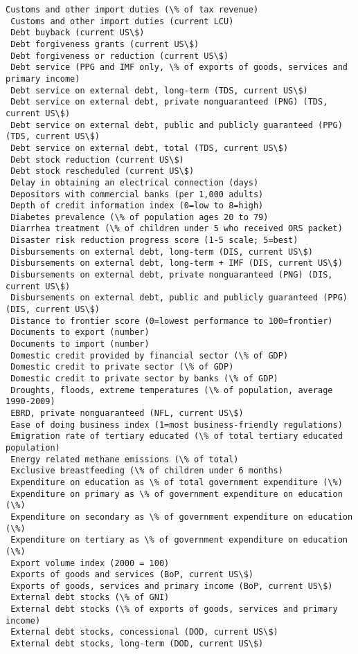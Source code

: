 \documentclass[11pt]{article}
\begin{document}
\begin{Verbatim}[commandchars=\\\{\}]
 Customs and other import duties (\% of tax revenue)
 Customs and other import duties (current LCU)
 Debt buyback (current US\$)
 Debt forgiveness grants (current US\$)
 Debt forgiveness or reduction (current US\$)
 Debt service (PPG and IMF only, \% of exports of goods, services and primary income)
 Debt service on external debt, long-term (TDS, current US\$)
 Debt service on external debt, private nonguaranteed (PNG) (TDS, current US\$)
 Debt service on external debt, public and publicly guaranteed (PPG) (TDS, current US\$)
 Debt service on external debt, total (TDS, current US\$)
 Debt stock reduction (current US\$)
 Debt stock rescheduled (current US\$)
 Delay in obtaining an electrical connection (days)
 Depositors with commercial banks (per 1,000 adults)
 Depth of credit information index (0=low to 8=high)
 Diabetes prevalence (\% of population ages 20 to 79)
 Diarrhea treatment (\% of children under 5 who received ORS packet)
 Disaster risk reduction progress score (1-5 scale; 5=best)
 Disbursements on external debt, long-term (DIS, current US\$)
 Disbursements on external debt, long-term + IMF (DIS, current US\$)
 Disbursements on external debt, private nonguaranteed (PNG) (DIS, current US\$)
 Disbursements on external debt, public and publicly guaranteed (PPG) (DIS, current US\$)
 Distance to frontier score (0=lowest performance to 100=frontier)
 Documents to export (number)
 Documents to import (number)
 Domestic credit provided by financial sector (\% of GDP)
 Domestic credit to private sector (\% of GDP)
 Domestic credit to private sector by banks (\% of GDP)
 Droughts, floods, extreme temperatures (\% of population, average 1990-2009)
 EBRD, private nonguaranteed (NFL, current US\$)
 Ease of doing business index (1=most business-friendly regulations)
 Emigration rate of tertiary educated (\% of total tertiary educated population)
 Energy related methane emissions (\% of total)
 Exclusive breastfeeding (\% of children under 6 months)
 Expenditure on education as \% of total government expenditure (\%)
 Expenditure on primary as \% of government expenditure on education (\%)
 Expenditure on secondary as \% of government expenditure on education (\%)
 Expenditure on tertiary as \% of government expenditure on education (\%)
 Export volume index (2000 = 100)
 Exports of goods and services (BoP, current US\$)
 Exports of goods, services and primary income (BoP, current US\$)
 External debt stocks (\% of GNI)
 External debt stocks (\% of exports of goods, services and primary income)
 External debt stocks, concessional (DOD, current US\$)
 External debt stocks, long-term (DOD, current US\$)

\end{Verbatim}
\end{document}
